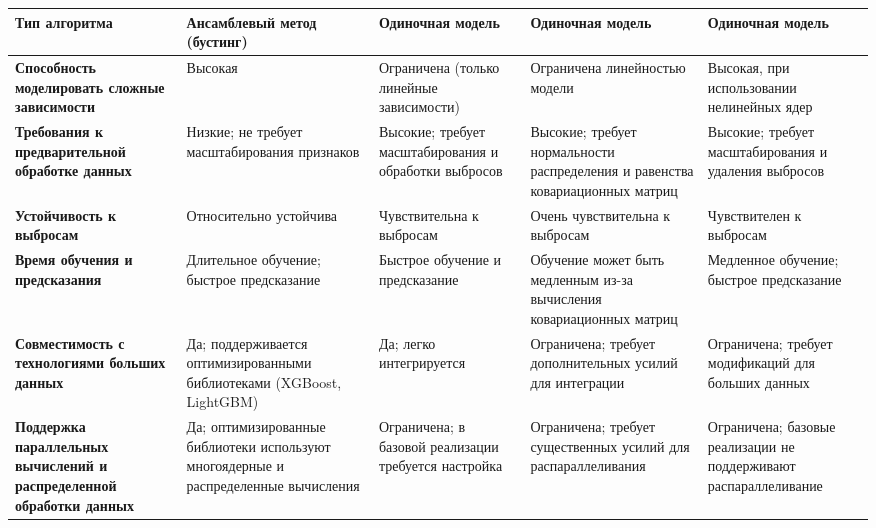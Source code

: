 {\begin{longtable}{|p{3cm}|p{3cm}|p{3cm}|p{3cm}|p{3cm}|}
  \textbf{Тип алгоритма}                                                       & Ансамблевый метод (бустинг)                                                         & Одиночная модель                                      & Одиночная модель                                                              & Одиночная модель                                                                  \\ \hline
  \textbf{Способность моделировать сложные зависимости}                        & Высокая                                                                             & Ограничена (только линейные зависимости)              & Ограничена линейностью модели                                                 & Высокая, при использовании нелинейных ядер                                        \\ \hline
  \textbf{Требования к предварительной обработке данных}                       & Низкие; не требует масштабирования признаков                                        & Высокие; требует масштабирования и обработки выбросов & Высокие; требует нормальности распределения и равенства ковариационных матриц & Высокие; требует масштабирования и удаления выбросов                              \\ \hline
  \textbf{Устойчивость к выбросам}                                             & Относительно устойчива                                                              & Чувствительна к выбросам                              & Очень чувствительна к выбросам                                                & Чувствителен к выбросам                                                           \\ \hline
  \textbf{Время обучения и предсказания}                                       & Длительное обучение; быстрое предсказание                                           & Быстрое обучение и предсказание                       & Обучение может быть медленным из-за вычисления ковариационных матриц          & Медленное обучение; быстрое предсказание                                          \\ \hline
  \textbf{Совместимость с технологиями больших данных}                         & Да; поддерживается оптимизированными библиотеками (XGBoost, LightGBM)               & Да; легко интегрируется                               & Ограничена; требует дополнительных усилий для интеграции                      & Ограничена; требует модификаций для больших данных                                \\ \hline
  \textbf{Поддержка параллельных вычислений и распределенной обработки данных} & Да; оптимизированные библиотеки используют многоядерные и распределенные вычисления & Ограничена; в базовой реализации требуется настройка  & Ограничена; требует существенных усилий для распараллеливания                 & Ограничена; базовые реализации не поддерживают распараллеливание                  \\ \hline
\end{longtable}
}


